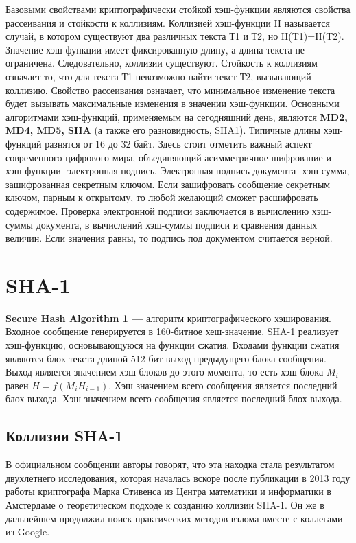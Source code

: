 \documentclass[a4paper,14pt]{report}
\begin{document}
Базовыми свойствами криптографически стойкой хэш-функции являются свойства рассеивания и стойкости к коллизиям.
Коллизией хэш-функции H называется случай, в котором существуют два различных текста Т1 и Т2, но H(T1)=H(T2). Значение хэш-функции имеет фиксированную длину, а длина текста не ограничена. Следовательно, коллизии существуют. Стойкость к коллизиям означает то, что для текста Т1 невозможно найти текст Т2, вызывающий коллизию.
Свойство рассеивания означает, что минимальное изменение текста будет вызывать максимальные изменения в значении хэш-функции.
Основными алгоритмами хэш-функций, применяемым на сегодняшний день, являются \textbf{MD2, MD4, MD5, SHA} (а также его разновидность, SHA1). Типичные длины хэш-функций разнятся от 16 до 32 байт.
Здесь стоит отметить важный аспект современного цифрового мира, объединяющий асимметричное шифрование и хэш-функции- электронная подпись. Электронная подпись документа- хэш сумма, зашифрованная секретным ключом. Если зашифровать сообщение секретным ключом, парным к открытому, то любой желающий сможет расшифровать содержимое. Проверка электронной подписи заключается в вычислению хэш-суммы документа, в вычислений хэш-суммы подписи и сравнения данных величин. Если значения равны, то подпись под документом считается верной.
\section{SHA-1}
\textbf{Secure Hash Algorithm 1 —} алгоритм криптографического хэширования. Входное сообщение генерируется в 160-битное хеш-значение. SHA-1 реализует хэш-функцию, основывающуюся на функции сжатия. Входами функции сжатия являются блок текста длиной 512 бит выход предыдущего блока сообщения. Выход является значением хэш-блоков до этого момента, то есть хэш блока $M_i$ равен $H=f(M_i H_{i-1})$. Хэш значением всего сообщения является последний блох выхода. Хэш значением всего сообщения является последний блох выхода.

\subsection{Коллизии SHA-1}

В официальном сообщении авторы говорят, что эта находка стала результатом двухлетнего исследования, которая началась вскоре после публикации в 2013 году работы криптографа Марка Стивенса из Центра математики и информатики в Амстердаме о теоретическом подходе к созданию коллизии SHA-1. Он же в дальнейшем продолжил поиск практических методов взлома вместе с коллегами из Google.
\end{document}
